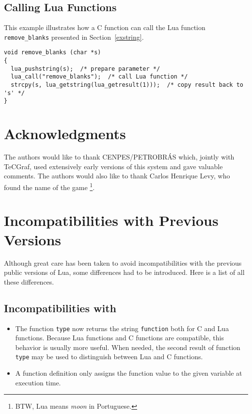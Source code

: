 \subsection{Calling Lua Functions} \label{exLuacall}

This example illustrates how a C function can call the Lua function
\verb'remove_blanks' presented in Section~\ref{exstring}.
\begin{verbatim}
void remove_blanks (char *s)
{
  lua_pushstring(s);  /* prepare parameter */
  lua_call("remove_blanks");  /* call Lua function */
  strcpy(s, lua_getstring(lua_getresult(1)));  /* copy result back to 's' */
}
\end{verbatim}


\section*{Acknowledgments}

The authors would like to thank CENPES/PETROBR\'AS which,
jointly with TeCGraf, used extensively early versions of
this system and gave valuable comments.
The authors would also like to thank Carlos Henrique Levy,
who found the name of the game%
\footnote{BTW, Lua means {\em moon} in Portuguese.}.



\appendix

\section{Incompatibilities with Previous Versions}

Although great care has been taken to avoid incompatibilities with
the previous public versions of Lua,
some differences had to be introduced.
Here is a list of all these differences.

\subsection*{Incompatibilities with }
\begin{itemize}
\item
The function {\tt type} now returns the string {\tt function}
both for C and Lua functions.
Because Lua functions and C functions are compatible,
this behavior is usually more useful.
When needed, the second result of function {\tt type} may be used
to distinguish between Lua and C functions.
\item
A function definition only assigns the function value to the
given variable at execution time.
\end{itemize}

